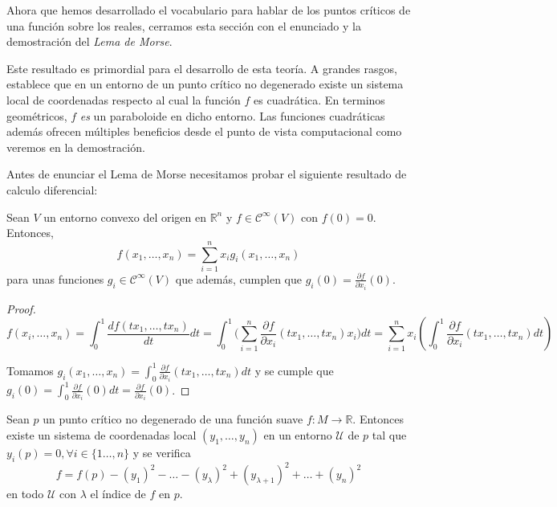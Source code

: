 Ahora que hemos desarrollado el vocabulario para hablar de los puntos críticos de una función sobre los reales, cerramos esta sección con el enunciado y la demostración del \textit{Lema de Morse}. 

Este resultado es primordial para el desarrollo de esta teoría. A grandes rasgos, establece que en un entorno de un punto crítico no degenerado existe un sistema local de coordenadas respecto al cual la función $f$ es cuadrática. En terminos geométricos, $f$ \textit{es} un paraboloide en dicho entorno. Las funciones cuadráticas además ofrecen múltiples beneficios desde el punto de vista computacional como veremos en la demostración.
\bigskip

Antes de enunciar el Lema de Morse necesitamos probar el siguiente resultado de calculo diferencial:

\begin{lemma}
    Sean $V$ un entorno convexo del origen en $\mathbb{R}^n$ y $f\in \mathcal{C}^\infty(V)$ con $f(0)=0$. Entonces,
    \begin{equation*}
        f(x_1,\dots,x_n)=\sum_{i=1}^n x_ig_i(x_1,\dots,x_n)
    \end{equation*}
    para unas funciones $g_i\in \mathcal{C}^\infty(V)$ que además, cumplen que $g_i(0)=\frac{\partial f}{\partial x_i}(0)$.
\end{lemma}
\begin{proof}
\begin{equation*}
    f(x_i,\dots,x_n)=\int_0^1 \frac{df(tx_1,\dots,tx_n)}{dt}dt = \int_0^1 \big(\sum_{i=1}^n \frac{\partial f}{\partial x_i}(tx_1,\dots,tx_n)x_i \big)dt =\sum_{i=1}^n x_i \left(\int_0^1 \frac{\partial f}{\partial x_i}(tx_1,\dots,tx_n )dt\right)
\end{equation*}

Tomamos $g_i(x_1,\dots,x_n) = \int_0^1 \frac{\partial f}{\partial x_i}(tx_1,\dots,tx_n )dt$ y se cumple que $g_i(0)=\int_0^1 \frac{\partial f}{\partial x_i}(0)dt =\frac{\partial f}{\partial x_i}(0)$.

\end{proof}
\bigskip


\begin{lemma}
\label{lemamorse}
    Sean $p$ un punto crítico no degenerado de una función suave $f:M\to \mathbb{R}$. Entonces existe un sistema de coordenadas local $(y_1,\dots, y_n)$ en un entorno $\mathcal{U}$ de $p$ tal que $y_i(p)=0, \forall i\in \{1\dots,n\}$ y se verifica
    \begin{equation*}
        f=f(p)-(y_1)^2-\dots-(y_\lambda)^2 + (y_{\lambda +1})^2+\dots + (y_n)^2
    \end{equation*}
    en todo $\mathcal{U}$ con $\lambda$ el índice de $f$ en $p$.
\end{lemma}
\bigskip

